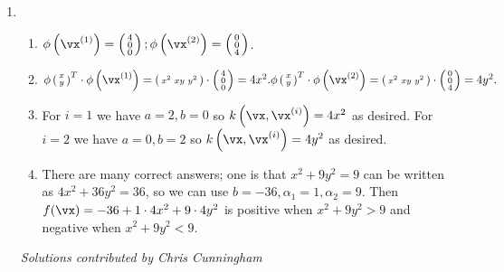 \documentclass{article}
\begin{document}
\begin{enumerate}
\item \begin{enumerate}
        \item $\phi\left( \vx^{(1)}\right) = \left( \begin{smallmatrix} 4 \\ 0 \\ 0 \end{smallmatrix} \right);
               \phi\left( \vx^{(2)}\right) = \left( \begin{smallmatrix} 0 \\ 0 \\ 4 \end{smallmatrix} \right)$.
        \item $\phi\left( \begin{smallmatrix} x \\ y \end{smallmatrix} \right)^T \cdot \phi\left(\vx^{(1)}\right) = 
        \left(\begin{smallmatrix} x^2 & xy & y^2 \end{smallmatrix}\right) \cdot \left( \begin{smallmatrix} 4 \\ 0 \\ 0 \end{smallmatrix} \right) = 4x^2.
        \newline
        \phi\left( \begin{smallmatrix} x \\ y \end{smallmatrix} \right)^T \cdot \phi\left(\vx^{(2)}\right) = 
        \left(\begin{smallmatrix} x^2 & xy & y^2 \end{smallmatrix}\right) \cdot \left( \begin{smallmatrix} 0 \\ 0 \\ 4 \end{smallmatrix} \right) = 4y^2.$
        \item For $i=1$ we have $a=2, b=0$ so $k\left(\vx, \vx^{(i)}\right) = 4x^2$ as desired. 
        \newline
        For $i=2$ we have $a=0, b=2$ so $k\left(\vx, \vx^{(i)}\right) = 4y^2$ as desired.
        \item There are many correct answers; one is that $x^2 + 9y^2 = 9$ can be written as $4x^2 + 36y^2 = 36$, so we can use $b = -36, \alpha_1 = 1, \alpha_2 = 9$. Then $f(\vx) = -36 + 1\cdot4x^2 + 9\cdot 4y^2$ is positive when $x^2 + 9y^2 > 9$ and negative when $x^2 + 9y^2 < 9$.
\end{enumerate}

{\em Solutions contributed by Chris Cunningham}


\end{enumerate}
\end{document}

